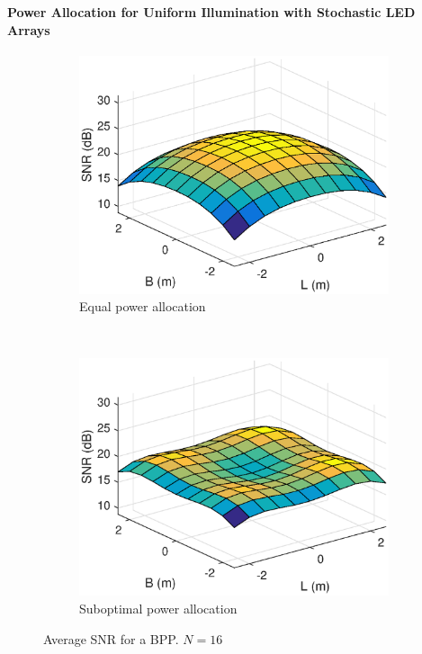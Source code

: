 \documentclass{beamer}
\theoremstyle{remark}
\begin{document}
\begin{frame}
\frametitle{\,}
\framesubtitle{Power Allocation for Uniform Illumination with
Stochastic LED Arrays}
\begin{figure}[t!]
    \centering
    \begin{subfigure}[t]{0.5\columnwidth}
        \centering
        \includegraphics[width=\columnwidth]{randomNoPowerDist_new}
        \caption{Equal power allocation}
\label{fig3:subfig1}        
    \end{subfigure}%
    ~ 
    \begin{subfigure}[t]{0.5\columnwidth}
        \centering
        \includegraphics[width=\columnwidth]{randomPowerDist_new}
        \caption{Suboptimal power allocation}
\label{fig3:subfig2}
    \end{subfigure}
    \caption{Average SNR for a BPP. $N=16$}
    \label{fig3}
  \end{figure}  
\end{frame}
\end{document}
